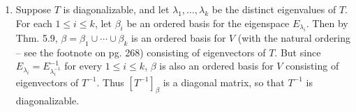 \documentclass[12pt]{article}
\begin{document}
\begin{enumerate}
\begin{enumerate}
\item
Suppose $T$ is diagonalizable, and let $\lambda_1, \dots, \lambda_k$ be the distinct eigenvalues of $T$. For each $1 \leq i \leq k$, let $\beta_i$ be an ordered basis for the eigenspace $E_{\lambda_i}$. Then by Thm. 5.9, $\beta = \beta_1 \cup \cdots \cup \beta_k$ is an ordered basis for $V$ (with the natural ordering -- see the footnote on pg. 268) consisting of eigenvectors of $T$. But since $E_{\lambda_i} = E^{-1}_{\lambda^{-1}_i}$ for every $1 \leq i \leq k$, $\beta$ is also an ordered basis for $V$ consisting of eigenvectors of $T^{-1}$. Thus $[T^{-1}]_\beta$ is a diagonal matrix, so that $T^{-1}$ is diagonalizable.

\end{enumerate}

\end{enumerate}
\end{document}

